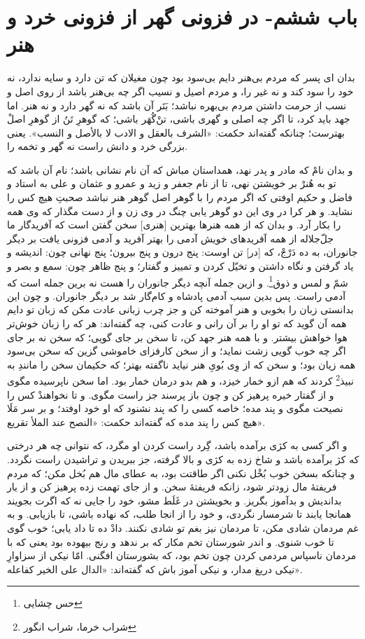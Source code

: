 \section*{باب ششم-
در فزونى گهر از فزونى خرد و هنر}

بدان اى پسر كه مردم بى‌هنر دايم بى‌سود بود چون مغيلان كه تن دارد و سايه ندارد، نه خود را سود كند و نه غير را، و مردم اصيل و نسيب اگر چه بى‌هنر باشد از روى اصل و نسب از حرمت داشتن مردم بى‌بهره نباشد؛ بَتَر آن باشد كه نه گهر دارد و نه هنر. اما جهد بايد كرد، تا اگر چه اصلى و گهرى باشى، تنْ‌گُهَر باشى؛ كه گوهرِ تَنُ از گوهرِ اصلْ بهترست؛ چنانكه گفته‌اند حكمت: «الشرف بالعقل و الادب لا بالأصل و النسب». يعنى بزرگى خرد و دانش راست نه گهر و تخمه را.

و بدان نامْ كه مادر و پدر نهد، همداستان مباش كه آن نام نشانى باشد؛ نام آن باشد كه تو به هُنرْ بر خويشتن نهى، تا از نام جعفر و زيد و عمرو و عثمان و على به استاد و فاضل و حكيم اوفتى كه اگر مردم را با گوهر اصل گوهر هنر نباشد صحبتِ هيچ كس را نشايد. و هر كرا در وى اين دو گوهر يابى چنگ در وى زن و از دست مگذار كه وى همه را بكار آرد. و بدان كه از همه هنرها بهترين [هنرى] سخن گفتن است كه آفريدگار ما جلّ‌جلاله از همه آفريدهاى خويش آدمى را بهتر آفريد و آدمى فزونى يافت بر ديگر جانوران، به ده دَرْجْ، كه [در] تن اوست: پنج درون و پنج بيرون؛ پنج نهانى چون: انديشه و ياد گرفتن و نگاه داشتن و تخيّل كردن و تمييز و گفتار؛ و پنج ظاهر چون: سمع و بصر و شمّ و لمس و ذوق\footnote{حس چشایی}. و ازين جمله آنچه ديگر جانوران را هست نه برين جمله است كه آدمى راست. پس بدين سبب آدمى پادشاه و كام‌گار شد بر ديگر جانوران. و چون اين بدانستى زبان را بخوبى و هنر آموخته كن و جز چرب زبانى عادت مكن كه زبان تو دايم همه آن گويد كه تو او را بر آن رانى و عادت كنى، چه گفته‌اند: هر كه را زبان خوش‌تر هوا خواهش بيشتر. و با همه هنر جهد كن، تا سخن بر جاى گويى؛ كه سخن نه بر جاى اگر چه خوب گويى زشت نمايد؛ و از سخن كارفزاى خاموشى گزين كه سخن بى‌سود همه زيان بود؛ و سخن كه از وِى بُوىِ هنر نيايد ناگفته بهتر؛ كه حكيمان سخن را مانندِ به نبيذ\footnote{شراب خرما، شراب انگور} كردند كه هم ازو خمار خيزد، و هم بدو درمان خمار بود. اما سخن ناپرسيده مگوى و از گفتار خيره پرهيز كن و چون باز پرسند جز راست مگوى. و تا نخواهندْ كس را نصيحت مگوى و پند مده؛ خاصه كسى را كه پند نشنود كه او خود اوفتد؛ و بر سر مَلَا هيچ كس را پند مده كه گفته‌اند حكمت: «النصح عند الملأ تقريع».

و اگر كسى به كژى برآمده باشد، گِرد راست كردن او مگرد، كه نتوانى چه هر درختى كه كژ برآمده باشد و شاخ زده به كژى و بالا گرفته، جز ببريدن و تراشيدن راست نگردد. و چنانكه بسخن خوب بُخْل نكنى اگر طاقتت بود، به عطاى مال هم بُخل مكن؛ كه مردم فريفتۀ مال زودتر شود، زانكه فريفتۀ سخن. و از جاى تهمت زده پرهيز كن و از يار بدانديش و بدآموز بگريز. و بخويشتن در غَلَط مشو، خود را جايى نه كه اگرت بجويند همانجا يابند تا شرمسار نگردى، و خود را از انجا طلب، كه نهاده باشى، تا بازيابى. و به غم مردمان شادى مكن، تا مردمان نيز بغم تو شادى نكنند. دادْ ده تا داد يابى؛ خوب گوى تا خوب شنوى. و اندر شورستان تخم مكار كه بر ندهد و رنج بيهوده بود يعنى كه با مردمان ناسپاس مردمى كردن چون تخم بود، كه بشورستان افگنى. امّا نيكى از سزاوارِ نيكى دريغ مدار، و نيكى آموز باش كه گفته‌اند: «الدال على الخير كفاعله».

